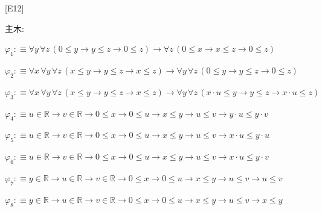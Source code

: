 \begin{fullproof}{[E12]}
\begin{ptree}
\end{ptree}
\noindent 主木:
\begin{ptree}
\noLine
{}
\noLine
{}
\end{ptree}
\begin{abbrevlist}
\item $\varphi_{1} :\equiv \forall y\,\forall z\,(0 \leq y \to y \leq z \to 0 \leq z) \to \forall z\,(0 \leq x \to x \leq z \to 0 \leq z)$
\item $\varphi_{2} :\equiv \forall x\,\forall y\,\forall z\,(x \leq y \to y \leq z \to x \leq z) \to \forall y\,\forall z\,(0 \leq y \to y \leq z \to 0 \leq z)$
\item $\varphi_{3} :\equiv \forall x\,\forall y\,\forall z\,(x \leq y \to y \leq z \to x \leq z) \to \forall y\,\forall z\,(x \cdot u \leq y \to y \leq z \to x \cdot u \leq z)$
\item $\varphi_{4} :\equiv u \in \mathbb{R} \to v \in \mathbb{R} \to 0 \leq x \to 0 \leq u \to x \leq y \to u \leq v \to y \cdot u \leq y \cdot v$
\item $\varphi_{5} :\equiv u \in \mathbb{R} \to v \in \mathbb{R} \to 0 \leq x \to 0 \leq u \to x \leq y \to u \leq v \to x \cdot u \leq y \cdot u$
\item $\varphi_{6} :\equiv u \in \mathbb{R} \to v \in \mathbb{R} \to 0 \leq x \to 0 \leq u \to x \leq y \to u \leq v \to x \cdot u \leq y \cdot v$
\item $\varphi_{7} :\equiv y \in \mathbb{R} \to u \in \mathbb{R} \to v \in \mathbb{R} \to 0 \leq x \to 0 \leq u \to x \leq y \to u \leq v \to u \leq v$
\item $\varphi_{8} :\equiv y \in \mathbb{R} \to u \in \mathbb{R} \to v \in \mathbb{R} \to 0 \leq x \to 0 \leq u \to x \leq y \to u \leq v \to x \leq y$

\end{abbrevlist}
\end{fullproof}
